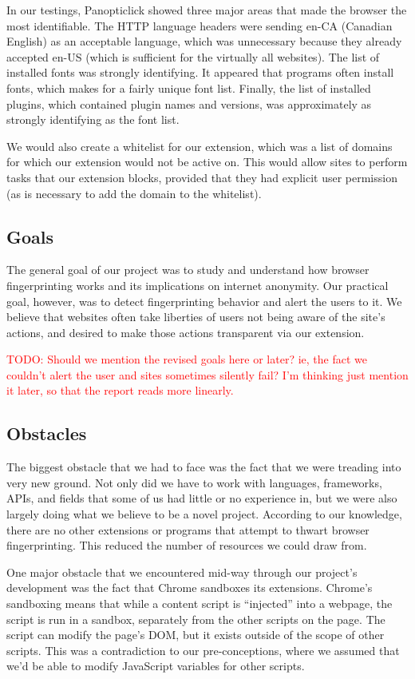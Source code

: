 \documentclass[12pt,a4paper]{article}
\begin{document}
In our testings, Panopticlick showed three major areas that made the browser the most identifiable. The HTTP language headers were sending en-CA (Canadian English) as an acceptable language, which was unnecessary because they already accepted en-US (which is sufficient for the virtually all websites). The list of installed fonts was strongly identifying. It appeared that programs often install fonts, which makes for a fairly unique font list. Finally, the list of installed plugins, which contained plugin names and versions, was approximately as strongly identifying as the font list.

We would also create a whitelist for our extension, which was a list of domains for which our extension would not be active on. This would allow sites to perform tasks that our extension blocks, provided that they had explicit user permission (as is necessary to add the domain to the whitelist).

\subsection{Goals}
The general goal of our project was to study and understand how browser fingerprinting works and its implications on internet anonymity. Our practical goal, however, was to detect fingerprinting behavior and alert the users to it. We believe that websites often take liberties of users not being aware of the site's actions, and desired to make those actions transparent via our extension.

\textcolor{red}{TODO: Should we mention the revised goals here or later? ie, the fact we couldn't alert the user and sites sometimes silently fail? I'm thinking just mention it later, so that the report reads more linearly.}

\subsection{Obstacles}
The biggest obstacle that we had to face was the fact that we were treading into very new ground. Not only did we have to work with languages, frameworks, APIs, and fields that some of us had little or no experience in, but we were also largely doing what we believe to be a novel project. According to our knowledge, there are no other extensions or programs that attempt to thwart browser fingerprinting. This reduced the number of resources we could draw from.

One major obstacle that we encountered mid-way through our project's development was the fact that Chrome sandboxes its extensions. Chrome's sandboxing means that while a content script is ``injected'' into a webpage, the script is run in a sandbox, separately from the other scripts on the page. The script can modify the page's DOM, but it exists outside of the scope of other scripts. This was a contradiction to our pre-conceptions, where we assumed that we'd be able to modify JavaScript variables for other scripts.
\end{document}
